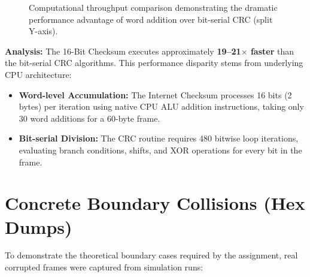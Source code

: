 \documentclass[11pt,a4paper]{article}
\begin{document}
\begin{figure}[H]
    \caption{Computational throughput comparison demonstrating the dramatic performance advantage of word addition over bit-serial CRC (split Y-axis).}
    \label{fig:throughput_chart}
\end{figure}

\textbf{Analysis:} The 16-Bit Checksum executes approximately \textbf{19--21$\times$ faster} than the bit-serial CRC algorithms. This performance disparity stems from underlying CPU architecture:
\begin{itemize}
    \item \textbf{Word-level Accumulation:} The Internet Checksum processes 16 bits (2 bytes) per iteration using native CPU ALU addition instructions, taking only 30 word additions for a 60-byte frame.
    \item \textbf{Bit-serial Division:} The CRC routine requires 480 bitwise loop iterations, evaluating branch conditions, shifts, and XOR operations for every bit in the frame.
\end{itemize}

\section{Concrete Boundary Collisions (Hex Dumps)}

To demonstrate the theoretical boundary cases required by the assignment, real corrupted frames were captured from simulation runs:
\end{document}
